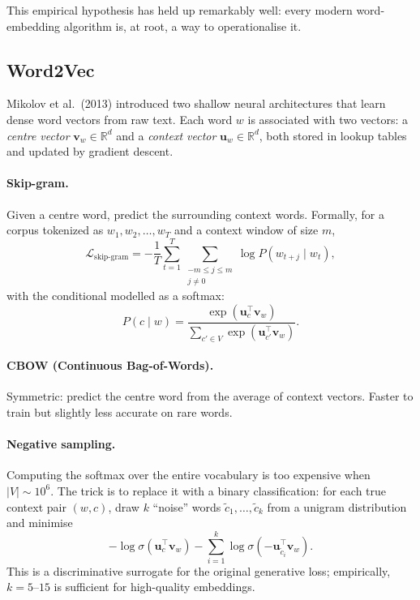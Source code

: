 This empirical hypothesis has held up remarkably well: every modern word-embedding algorithm is, at root, a way to operationalise it.

\subsection{Word2Vec}

Mikolov et al.\ (2013) introduced two shallow neural architectures that learn dense word vectors from raw text. Each word $w$ is associated with two vectors: a \emph{centre vector} $\mathbf{v}_w \in \mathbb{R}^d$ and a \emph{context vector} $\mathbf{u}_w \in \mathbb{R}^d$, both stored in lookup tables and updated by gradient descent.

\paragraph{Skip-gram.} Given a centre word, predict the surrounding context words. Formally, for a corpus tokenized as $w_1, w_2, \dots, w_T$ and a context window of size $m$,
\[ \mathcal{L}_{\text{skip-gram}} = -\frac{1}{T}\sum_{t=1}^{T}\sum_{\substack{-m \le j \le m \\ j \neq 0}} \log P(w_{t+j} \mid w_t), \]
with the conditional modelled as a softmax:
\[ P(c \mid w) = \frac{\exp(\mathbf{u}_c^\top \mathbf{v}_w)}{\sum_{c' \in V} \exp(\mathbf{u}_{c'}^\top \mathbf{v}_w)}. \]

\paragraph{CBOW (Continuous Bag-of-Words).} Symmetric: predict the centre word from the average of context vectors. Faster to train but slightly less accurate on rare words.

\paragraph{Negative sampling.} Computing the softmax over the entire vocabulary is too expensive when $|V| \sim 10^6$. The trick is to replace it with a binary classification: for each true context pair $(w, c)$, draw $k$ ``noise'' words $\tilde{c}_1, \dots, \tilde{c}_k$ from a unigram distribution and minimise
\[ -\log \sigma(\mathbf{u}_c^\top \mathbf{v}_w) - \sum_{i=1}^{k} \log \sigma(-\mathbf{u}_{\tilde{c}_i}^\top \mathbf{v}_w). \]
This is a discriminative surrogate for the original generative loss; empirically, $k = 5$--$15$ is sufficient for high-quality embeddings.

